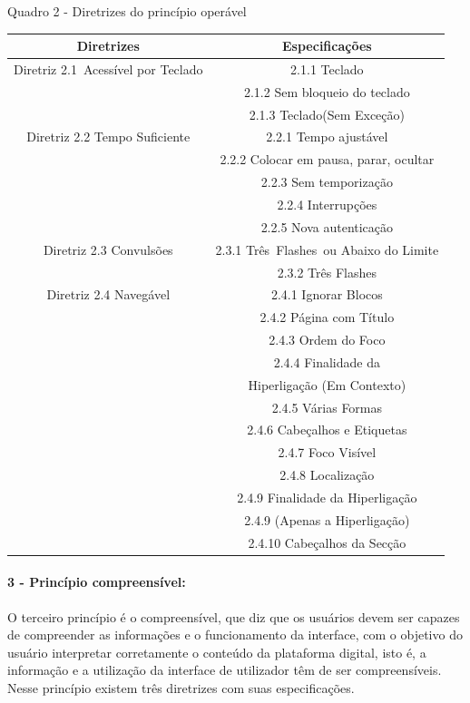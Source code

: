 \documentclass[a4paper]{article}
\begin{document}
\begin{titlepage}
Quadro 2 - Diretrizes do princípio operável\\[-1cm]
\begin{center}
	\fontsize{8pt}{8pt}\selectfont
	\begin{longtable}{|c|c|}
		\hline
		Diretrizes & Especificações \\
		\hline
		Diretriz 2.1 Acessível por Teclado& 2.1.1 Teclado\\
		& 2.1.2 Sem bloqueio do teclado\\
		& 2.1.3 Teclado(Sem Exceção)\\
		\hline
		Diretriz 2.2 Tempo Suficiente & 2.2.1 Tempo ajustável \\
		& 2.2.2 Colocar em pausa, parar, ocultar\\
		& 2.2.3 Sem temporização\\
		& 2.2.4 Interrupções\\
		& 2.2.5 Nova autenticação\\
		\hline
		Diretriz 2.3 Convulsões& 2.3.1 Três Flashes ou Abaixo do Limite\\
		& 2.3.2 Três Flashes\\
		\hline
		Diretriz 2.4 Navegável& 2.4.1 Ignorar Blocos\\
		& 2.4.2 Página com Título\\
		& 2.4.3 Ordem do Foco\\
		& 2.4.4 Finalidade da\\
		& Hiperligação (Em Contexto)\\
		& 2.4.5 Várias Formas\\
		& 2.4.6 Cabeçalhos e Etiquetas\\
		& 2.4.7 Foco Visível\\
		& 2.4.8 Localização\\
		& 2.4.9 Finalidade da Hiperligação\\
		& 2.4.9 (Apenas a Hiperligação)\\
		& 2.4.10 Cabeçalhos da Secção\\
		\hline
	\end{longtable}
\end{center}

\paragraph{3 - Princípio compreensível: }

O terceiro princípio é o compreensível, que diz que os usuários devem ser capazes de compreender as informações e o funcionamento da interface, com o objetivo do usuário interpretar corretamente o conteúdo da plataforma digital, isto é, a informação e a utilização da interface de utilizador têm de ser compreensíveis. Nesse princípio existem três diretrizes com suas especificações.


\end{titlepage}
\end{document}
